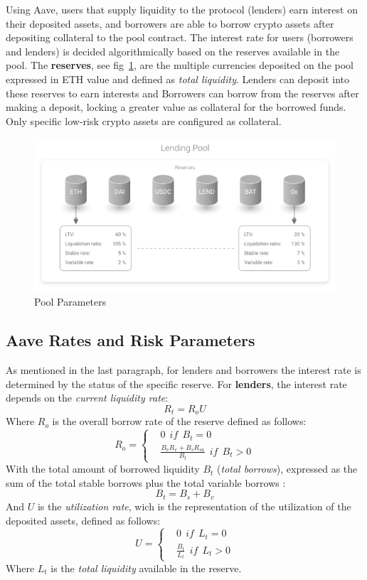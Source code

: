 \documentclass[11pt,a4paper]{report}
\begin{document}
Using Aave, users that supply liquidity to the protocol (lenders) earn interest on their deposited assets, and borrowers are able to borrow crypto assets after depositing collateral to the pool contract. The interest rate for users (borrowers and lenders) is decided algorithmically based on the reserves available in the pool. The \textbf{reserves}, see fig~\ref{fig:pool}, are the multiple currencies deposited on the pool expressed in ETH value and defined as \textit{total liquidity}. Lenders can deposit into these reserves to earn interests and Borrowers can borrow from the reserves after making a deposit, locking a greater value as collateral for the borrowed funds. Only specific low-risk crypto assets are configured as collateral.\label{reserve}  

\begin{figure}[htp]
	\centering
	\includegraphics[width=1\textwidth]{./images/lp_reserves}
	\caption{Pool Parameters\cite{aaveV1}}
	\label{fig:pool}
\end{figure}
\subsection{Aave Rates and Risk Parameters}\label{rates}
 As mentioned in the last paragraph, for lenders and borrowers the interest rate is determined by the status of the specific reserve. For \textbf{lenders}, the interest rate depends on  the \textit{current liquidity rate}:
\[ R_{t} = R_{o}U \]
Where $ R_{o} $ is the overall borrow rate of the reserve defined as follows:
\begin{equation}
	R_{o} = 
	\left\{\begin{matrix}
		&  0~~if~~B_{t}=0\\ 
		& \frac{B_{v}R_{v}+ B_{s}R_{sa}}{B_{t}}~~if~~B_{t} > 0
	\end{matrix}\right.
\end{equation}
With the total amount of borrowed liquidity $B_{t} $ (\textit{total borrows}), expressed as the sum of the total stable borrows plus  the total variable borrows :
\[ B_{t} = B_{s}+B_{v} \]
And $ U $ is the \textit{utilization rate}, wich is the representation of the utilization of the deposited assets, defined as follows:
\begin{equation}
	U = 
	\left\{\begin{matrix}
		&  0~~if~~L_{t}=0\\ 
		& \frac{B_{t}}{L_{t}}~~if~~L_{t} > 0
	\end{matrix}\right.
\end{equation}
Where $L_{t}$  is the \textit{total liquidity} available in the reserve.
\end{document}
